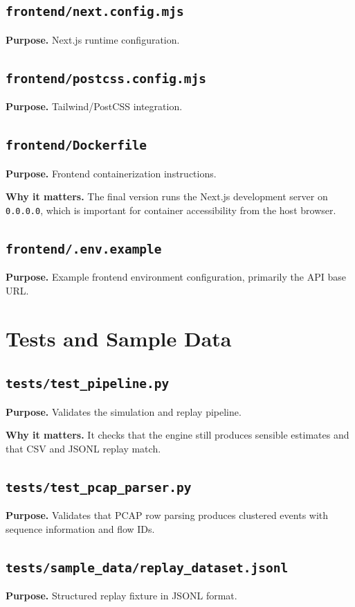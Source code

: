 \documentclass[12pt,a4paper]{report}
\begin{document}
\section{\texttt{frontend/next.config.mjs}}
\textbf{Purpose.} Next.js runtime configuration.

\section{\texttt{frontend/postcss.config.mjs}}
\textbf{Purpose.} Tailwind/PostCSS integration.

\section{\texttt{frontend/Dockerfile}}
\textbf{Purpose.} Frontend containerization instructions.

\textbf{Why it matters.} The final version runs the Next.js development server on \texttt{0.0.0.0}, which is important for container accessibility from the host browser.

\section{\texttt{frontend/.env.example}}
\textbf{Purpose.} Example frontend environment configuration, primarily the API base URL.

\chapter{Tests and Sample Data}
\section{\texttt{tests/test\_pipeline.py}}
\textbf{Purpose.} Validates the simulation and replay pipeline.

\textbf{Why it matters.} It checks that the engine still produces sensible estimates and that CSV and JSONL replay match.

\section{\texttt{tests/test\_pcap\_parser.py}}
\textbf{Purpose.} Validates that PCAP row parsing produces clustered events with sequence information and flow IDs.

\section{\texttt{tests/sample\_data/replay\_dataset.jsonl}}
\textbf{Purpose.} Structured replay fixture in JSONL format.
\end{document}
